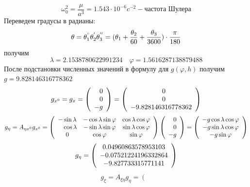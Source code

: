 \documentclass[a4paper,14pt]{article}
\theoremstyle{plain} %
\theoremstyle{definition} %
\theoremstyle{remark} %
\begin{document}
{\[
    \omega^2_0=\frac{\mu}{a^3}=1.543\cdot10^{-6}c^{-2} - \text{частота Шулера}
\]
Переведем градусы в радианы:
\[
    \theta=\theta^{\degree}_1\theta^{'}_2\theta^{''}_3=
    (\theta_1+\frac{\theta_2}{60}+\frac{\theta_3}{3600})\cdot\frac{\pi}{180}
\]
получим
\[
    \lambda=2.1538780622991234 \quad
    \varphi=1.5616287138879488
\]
После подстановки численных значений в формулу для $g(\varphi,h)$ получим $g=9.828146316778362$
\begin{eqnarray*}
    g_{x^0}=g_{x} =
    \left(
    \begin{array}{c}
            \phantom{-} 0 \cr
            \phantom{-} 0 \cr
            -g
        \end{array}
    \right)=
    \left(
    \begin{array}{c}
            \phantom{-} 0 \cr
            \phantom{-} 0 \cr
            -9.828146316778362
        \end{array}
    \right)
\end{eqnarray*}
\begin{eqnarray*}
    g_{\eta}=A_{ \eta x^0}g_{x^0} =
    \left(
    \begin{array}{ccc}
            -\sin \lambda           & -\cos \lambda \sin \varphi & \cos \lambda \cos \varphi  \cr
            \phantom{-}\cos \lambda & -\sin \lambda \sin \varphi & \sin \lambda \cos \varphi \cr
            0                       & \cos \varphi               & \sin \varphi
        \end{array}
    \right) \left(
    \begin{array}{c}
            \phantom{-} 0 \cr
            \phantom{-} 0 \cr
            -g
        \end{array}
    \right)=\left(
    \begin{array}{c}
            -g\cos \lambda \cos \varphi \cr
            -g\sin \lambda \cos \varphi  \cr
            -g\sin \varphi
        \end{array}
    \right)
\end{eqnarray*}
\begin{eqnarray*}
    g_{\eta}=
    \left(
    \begin{array}{c}
            0.04960863578953103 \cr
            -0.07521224196332864 \cr
            -9.827733315771141
        \end{array}
    \right)
\end{eqnarray*}
\begin{eqnarray*}
    g_\xi=A_{\xi\eta }g_\eta=
    \left(
    \begin{array}{ccc}

\end{array}
\end{eqnarray*}}
\end{document}
